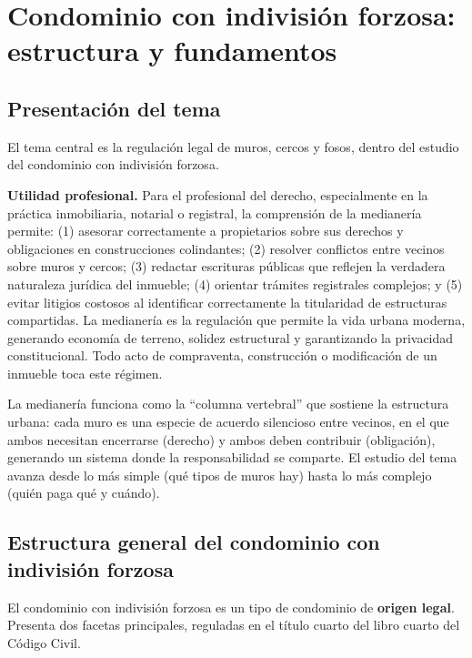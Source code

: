 \documentclass[12pt,oneside]{book}
\begin{document}

\chapter{Condominio con indivisión forzosa: estructura y fundamentos}

\section{Presentación del tema}

El tema central es la regulación legal de muros, cercos y fosos, dentro del estudio del condominio con indivisión forzosa.

\begin{note}
\textbf{Utilidad profesional.} Para el profesional del derecho, especialmente en la práctica inmobiliaria, notarial o registral, la comprensión de la medianería permite: (1) asesorar correctamente a propietarios sobre sus derechos y obligaciones en construcciones colindantes; (2) resolver conflictos entre vecinos sobre muros y cercos; (3) redactar escrituras públicas que reflejen la verdadera naturaleza jurídica del inmueble; (4) orientar trámites registrales complejos; y (5) evitar litigios costosos al identificar correctamente la titularidad de estructuras compartidas. La medianería es la regulación que permite la vida urbana moderna, generando economía de terreno, solidez estructural y garantizando la privacidad constitucional. Todo acto de compraventa, construcción o modificación de un inmueble toca este régimen.
\end{note}

La medianería funciona como la ``columna vertebral'' que sostiene la estructura urbana: cada muro es una especie de acuerdo silencioso entre vecinos, en el que ambos necesitan encerrarse (derecho) y ambos deben contribuir (obligación), generando un sistema donde la responsabilidad se comparte. El estudio del tema avanza desde lo más simple (qué tipos de muros hay) hasta lo más complejo (quién paga qué y cuándo).

\section{Estructura general del condominio con indivisión forzosa}

El condominio con indivisión forzosa es un tipo de condominio de \textbf{origen legal}. Presenta dos facetas principales, reguladas en el título cuarto del libro cuarto del Código Civil.
\end{document}
